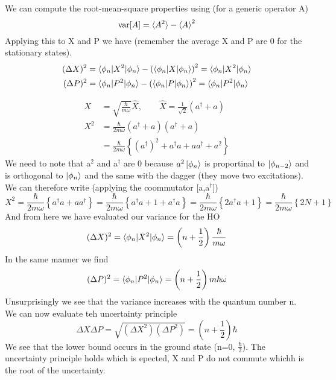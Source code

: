 \documentclass{article}
\newcommand{\be}{\begin{equation}}
\newcommand{\ee}{\end{equation}}
\newcommand{\dg}{\dagger}
\begin{document}
We can compute the root-mean-square properties using (for a generic operator A)
\be
\text{var}[A] = \braket{A^2} - \braket{A}^2
\ee
Applying this to X and P we have (remember the average X and P are 0 for the stationary states). 
\be
\begin{split}
    (\Delta X)^2 &= \braket{\phi_n|X^2|\phi_n} - \left(\braket{\phi_n|X|\phi_n}\right)^2 = \braket{\phi_n|X^2|\phi_n}\\
    (\Delta P)^2 &= \braket{\phi_n|P^2|\phi_n} - \left(\braket{\phi_n|P|\phi_n}\right)^2 = \braket{\phi_n|P^2|\phi_n}
\end{split}
\ee

\be
\begin{split}
    X &= \sqrt{\frac{\hbar}{m\omega}}\hat{X}, \qquad \hat{X} = \frac{1}{\sqrt{2}}\left(a^\dg + a\right) \\
    X^2 &= \frac{\hbar}{2m\omega} \left(a^\dg + a\right) \left(a^\dg + a\right)\\
    &= \frac{\hbar}{2m\omega} \left\{(a^\dg) ^2 + a^\dg a + a a^\dg + a^2\right\}
\end{split}
\ee
We need to note that a$^2$ and a$^\dg$ are 0 because $a^2\ket{\phi_n}$ is proportinal to $\ket{\phi_{n-2}}$ and is orthogonal to $\ket{\phi_n}$ and the same with the dagger (they move two excitations). 
We can therefore write (applying the coommutator [a,a$^\dg$])
\be
    X^2 = \frac{\hbar}{2m\omega} \left\{ a^\dg a + a a^\dg\right\} = \frac{\hbar}{2m\omega} \left\{ a^\dg a + 1 + a^\dg a \right\} = \frac{\hbar}{2m\omega} \left\{ 2a^\dg a + 1\right\} = \frac{\hbar}{2m\omega} \left\{ 2N + 1\right\}
\ee
And from here we have evaluated our variance for the HO
\be
(\Delta X)^2 = \braket{\phi_n|X^2|\phi_n} = \left(n + \frac{1}{2}\right) \frac{\hbar}{m\omega}
\ee
In the same manner we find
\be
(\Delta P)^2 = \braket{\phi_n|P^2|\phi_n} = \left(n + \frac{1}{2}\right) m\hbar\omega
\ee
Unsurprisingly we see that the variance increases with the quantum number n. 
We can now evaluate teh uncertainty principle
\be
\Delta X \Delta P = \sqrt{(\Delta X^2)(\Delta P^2)} = \left(n+ \frac{1}{2}\right)\hbar
\ee
We see that the lower bound occurs in the ground state (n=0, $\frac{\hbar}{2}$).
The uncertainty principle holds which is epected, X and P do not commute whichh is the root of the uncertainty. 
\end{document}
